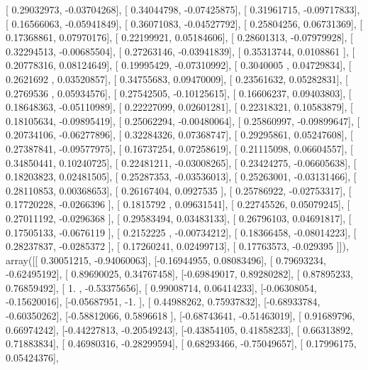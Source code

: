 \documentclass{article}
\begin{document}
       [ 0.29032973, -0.03704268],
       [ 0.34044798, -0.07425875],
       [ 0.31961715, -0.09717833],
       [ 0.16566063, -0.05941849],
       [ 0.36071083, -0.04527792],
       [ 0.25804256,  0.06731369],
       [ 0.17368861,  0.07970176],
       [ 0.22199921,  0.05184606],
       [ 0.28601313, -0.07979928],
       [ 0.32294513, -0.00685504],
       [ 0.27263146, -0.03941839],
       [ 0.35313744,  0.0108861 ],
       [ 0.20778316,  0.08124649],
       [ 0.19995429, -0.07310992],
       [ 0.3040005 ,  0.04729834],
       [ 0.2621692 ,  0.03520857],
       [ 0.34755683,  0.09470009],
       [ 0.23561632,  0.05282831],
       [ 0.2769536 ,  0.05934576],
       [ 0.27542505, -0.10125615],
       [ 0.16606237,  0.09403803],
       [ 0.18648363, -0.05110989],
       [ 0.22227099,  0.02601281],
       [ 0.22318321,  0.10583879],
       [ 0.18105634, -0.09895419],
       [ 0.25062294, -0.00480064],
       [ 0.25860997, -0.09899647],
       [ 0.20734106, -0.06277896],
       [ 0.32284326,  0.07368747],
       [ 0.29295861,  0.05247608],
       [ 0.27387841, -0.09577975],
       [ 0.16737254,  0.07258619],
       [ 0.21115098,  0.06604557],
       [ 0.34850441,  0.10240725],
       [ 0.22481211, -0.03008265],
       [ 0.23424275, -0.06605638],
       [ 0.18203823,  0.02481505],
       [ 0.25287353, -0.03536013],
       [ 0.25263001, -0.03131466],
       [ 0.28110853,  0.00368653],
       [ 0.26167404,  0.0927535 ],
       [ 0.25786922, -0.02753317],
       [ 0.17720228, -0.0266396 ],
       [ 0.1815792 ,  0.09631541],
       [ 0.22745526,  0.05079245],
       [ 0.27011192, -0.0296368 ],
       [ 0.29583494,  0.03483133],
       [ 0.26796103,  0.04691817],
       [ 0.17505133, -0.0676119 ],
       [ 0.2152225 , -0.00734212],
       [ 0.18366458, -0.08014223],
       [ 0.28237837, -0.0285372 ],
       [ 0.17260241,  0.02499713],
       [ 0.17763573, -0.029395  ]]), array([[ 0.30051215, -0.94060063],
       [-0.16944955,  0.08083496],
       [ 0.79693234, -0.62495192],
       [ 0.89690025,  0.34767458],
       [-0.69849017,  0.89280282],
       [ 0.87895233,  0.76859492],
       [ 1.        , -0.53375656],
       [ 0.99008714,  0.06414233],
       [-0.06308054, -0.15620016],
       [-0.05687951, -1.        ],
       [ 0.44988262,  0.75937832],
       [-0.68933784, -0.60350262],
       [-0.58812066,  0.5896618 ],
       [-0.68743641, -0.51463019],
       [ 0.91689796,  0.66974242],
       [-0.44227813, -0.20549243],
       [-0.43854105,  0.41858233],
       [ 0.66313892,  0.71883834],
       [ 0.46980316, -0.28299594],
       [ 0.68293466, -0.75049657],
       [ 0.17996175,  0.05424376],
\end{document}
